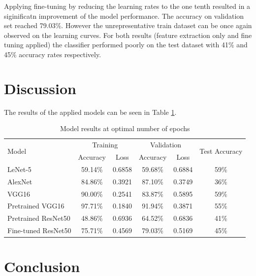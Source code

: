 \documentclass[10pt, final]{article}
\begin{document}
Applying fine-tuning by reducing the learning rates to the one tenth resulted in a siginificatn improvement
of the model performance.
The accuracy on validation set reached 79.03\%.
However the unrepresentative train dataset can be once again observed on the learning curves.
For both results (feature extraction only and fine tuning applied) the classifier performed poorly on the test
dataset with 41\% and 45\% accuracy rates respectively.

\section{Discussion} \label{sec:discussion}

The results of the applied models can be seen in Table \ref{table:results_summary}.

\begin{table}[!ht]
	\centering
	\begin{tabular}{l c c c c c}
		\multirow{2}{*}{Model} & \multicolumn{2}{c}{Training} & \multicolumn{2}{c}{Validation} & \multirow{2}{*}{Test Accuracy}                 \\
		                       & Accuracy                     & Loss                           & Accuracy                       & Loss   &      \\
		\hline
		LeNet-5                & 59.14\%                      & 0.6858                         & 59.68\%                        & 0.6884 & 59\% \\
		AlexNet                & 84.86\%                      & 0.3921                         & 87.10\%                        & 0.3749 & 36\% \\
		VGG16                  & 90.00\%                      & 0.2541                         & 83.87\%                        & 0.5895 & 59\% \\
		Pretrained VGG16       & 97.71\%                      & 0.1840                         & 91.94\%                        & 0.3871 & 55\% \\
		Pretrained ResNet50    & 48.86\%                      & 0.6936                         & 64.52\%                        & 0.6836 & 41\% \\
		Fine-tuned ResNet50    & 75.71\%                      & 0.4569                         & 79.03\%                        & 0.5169 & 45\% \\
		\hline
	\end{tabular}
	\caption{Model results at optimal number of epochs}
	\label{table:results_summary}
\end{table}

\section{Conclusion} \label{sec:conclusion}
\newpage
\listoffigures
\newpage
\listoftables
\newpage
\printbibliography
\end{document}

